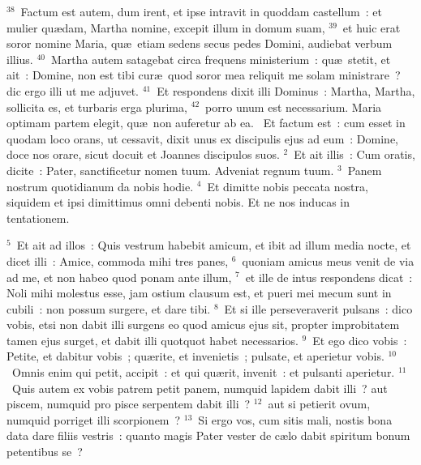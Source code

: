 ${}^{38}$~Factum est autem, dum irent, et ipse intravit in quoddam castellum~: et mulier qu\ae dam, Martha nomine, excepit illum in domum suam,
${}^{39}$~et huic erat soror nomine Maria, qu\ae\ etiam sedens secus pedes Domini, audiebat verbum illius.
${}^{40}$~Martha autem satagebat circa frequens ministerium~: qu\ae\ stetit, et ait~: Domine, non est tibi cur\ae\ quod soror mea reliquit me solam ministrare~? dic ergo illi ut me adjuvet.
${}^{41}$~Et respondens dixit illi Dominus~: Martha, Martha, sollicita es, et turbaris erga plurima,
${}^{42}$~porro unum est necessarium. Maria optimam partem elegit, qu\ae\ non auferetur ab ea.
~Et factum est~: cum esset in quodam loco orans, ut cessavit, dixit unus ex discipulis ejus ad eum~: Domine, doce nos orare, sicut docuit et Joannes discipulos suos.
${}^{2}$~Et ait illis~: Cum oratis, dicite~: Pater, sanctificetur nomen tuum. Adveniat regnum tuum.
${}^{3}$~Panem nostrum quotidianum da nobis hodie.
${}^{4}$~Et dimitte nobis peccata nostra, siquidem et ipsi dimittimus omni debenti nobis. Et ne nos inducas in tentationem.


${}^{5}$~Et ait ad illos~: Quis vestrum habebit amicum, et ibit ad illum media nocte, et dicet illi~: Amice, commoda mihi tres panes,
${}^{6}$~quoniam amicus meus venit de via ad me, et non habeo quod ponam ante illum,
${}^{7}$~et ille de intus respondens dicat~: Noli mihi molestus esse, jam ostium clausum est, et pueri mei mecum sunt in cubili~: non possum surgere, et dare tibi.
${}^{8}$~Et si ille perseveraverit pulsans~: dico vobis, etsi non dabit illi surgens eo quod amicus ejus sit, propter improbitatem tamen ejus surget, et dabit illi quotquot habet necessarios.
${}^{9}$~Et ego dico vobis~: Petite, et dabitur vobis~; qu\ae rite, et invenietis~; pulsate, et aperietur vobis.
${}^{10}$~Omnis enim qui petit, accipit~: et qui qu\ae rit, invenit~: et pulsanti aperietur.
${}^{11}$~Quis autem ex vobis patrem petit panem, numquid lapidem dabit illi~? aut piscem, numquid pro pisce serpentem dabit illi~?
${}^{12}$~aut si petierit ovum, numquid porriget illi scorpionem~?
${}^{13}$~Si ergo vos, cum sitis mali, nostis bona data dare filiis vestris~: quanto magis Pater vester de c\ae lo dabit spiritum bonum petentibus se~?


